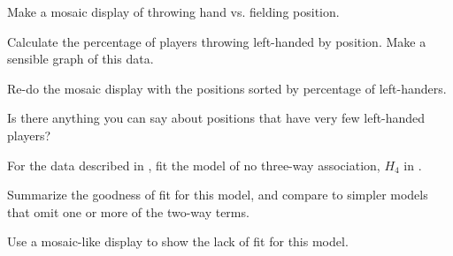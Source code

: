 \documentclass[10pt,krantz2]{krantz}\usepackage[]{graphicx}\usepackage[]{color}
\makeatletter
\newenvironment{kframe}{%
 \def\at@end@of@kframe{}%
 \ifinner\ifhmode%
  \def\at@end@of@kframe{\end{minipage}}%
  \begin{minipage}{\columnwidth}%
 \fi\fi%
 \def\FrameCommand##1{\hskip\@totalleftmargin \hskip-\fboxsep
 \colorbox{shadecolor}{##1}\hskip-\fboxsep
     \hskip-\linewidth \hskip-\@totalleftmargin \hskip\columnwidth}%
 \MakeFramed {\advance\hsize-\width
   \@totalleftmargin\z@ \linewidth\hsize
   \@setminipage}}%
 {\par\unskip\endMakeFramed%
 \at@end@of@kframe}
\newenvironment{knitrout}{}{} %
\renewenvironment{knitrout}{\small\renewcommand{\baselinestretch}{.85}}{} %
\makeatother
\begin{document}
\begin{Exercises}
\begin{knitrout}
\begin{kframe}
{\ttfamily\noindent\bfseries\color{errorcolor}{Error in with(MasterFielding, table(POS, throws)): object 'MasterFielding' not found}}\end{kframe}
\end{knitrout}
  \begin{enumerate*}
    \item Make a mosaic display of throwing hand vs. fielding position.
    \item Calculate the percentage of players throwing left-handed by position.
    Make a sensible graph of this data.
    \item Re-do the mosaic display with the positions sorted by percentage of left-handers.
    \item Is there anything you can say about positions that have very few left-handed
    players?
  \end{enumerate*}


\exercise For the  data described in , fit the model of no three-way
association, $H_4$ in . 
  \begin{enumerate*}
  \item Summarize the goodness of fit for this model, and compare to simpler models that
  omit one or more of the two-way terms.
  \item Use a mosaic-like display to show the lack of fit for this model.
  \end{enumerate*}


\end{Exercises}
\end{document}

